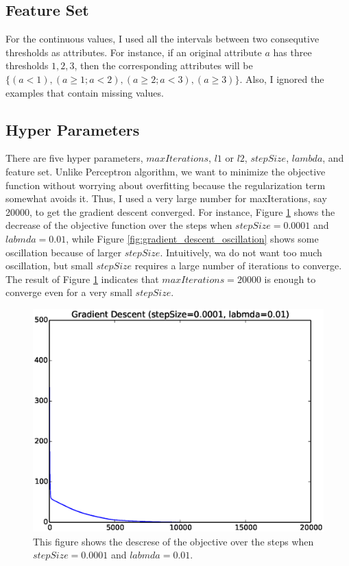 \subsection*{Feature Set}
For the continuous values, I used all the intervals between two consequtive thresholds as attributes. For instance, if an original attribute $a$ has three thresholds ${1, 2, 3}$, then the corresponding attributes will be $\{(a<1),(a\ge 1; a<2),(a\ge 2; a<3),(a\ge 3)\}$. Also, I ignored the examples that contain missing values.

\subsection*{Hyper Parameters}
There are five hyper parameters, $maxIterations$, $l1$ or $l2$, $stepSize$, $lambda$, and feature set. Unlike Perceptron algorithm, we want to minimize the objective function without worrying about overfitting because the regularization term somewhat avoids it. Thus, I used a very large number for maxIterations, say 20000, to get the gradient descent converged. For instance, Figure \ref{fig:gradient_descent} shows the decrease of the objective function over the steps when $stepSize=0.0001$ and $labmda=0.01$, while Figure \ref{fig:gradient_descent_oscillation} shows some oscillation because of larger $stepSize$. Intuitively, wa do not want too much oscillation, but small $stepSize$ requires a large number of iterations to converge. The result of Figure \ref{fig:gradient_descent} indicates that $maxIterations=20000$ is enough to converge even for a very small $stepSize$.

\begin{figure}[hbtp]
\centering
\includegraphics[width=120mm]{gradient_descent}
\caption{This figure shows the descrese of the objective over the steps when $stepSize=0.0001$ and $labmda=0.01$.}
\label{fig:gradient_descent}
\end{figure}

